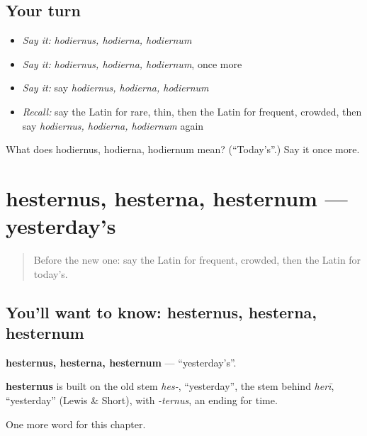 \subsection*{Your turn}
\begin{itemize}
\raggedright
  \item \emph{Say it:} \emph{hodiernus, hodierna, hodiernum}
  \item \emph{Say it:} \emph{hodiernus, hodierna, hodiernum}, once more
  \item \emph{Say it:} say \emph{hodiernus, hodierna, hodiernum}
  \item \emph{Recall:} say the Latin for rare, thin, then the Latin for frequent, crowded, then say \emph{hodiernus, hodierna, hodiernum} again
\end{itemize}

\begin{tcolorbox}[breakable,colback=teal!4,colframe=teal!35!black,title={Before you move on}]
What does hodiernus, hodierna, hodiernum mean? (\textquotedblleft{}Today's\textquotedblright{}.) Say it once more.
\end{tcolorbox}
\section[hesternus, hesterna, hesternum]{hesternus, hesterna, hesternum — yesterday's}

\label{lesson:LA-C215-hesternus}



\begin{quote}
Before the new one: say the Latin for frequent, crowded, then the Latin for today's.
\end{quote}

\subsection*{You'll want to know: hesternus, hesterna, hesternum}
\textbf{hesternus, hesterna, hesternum} — \textquotedblleft{}yesterday's\textquotedblright{}.

\begin{cousinweb}
\textbf{hesternus} is built on the old stem \emph{hes-}, \textquotedblleft{}yesterday\textquotedblright{}, the stem behind \emph{herī}, \textquotedblleft{}yesterday\textquotedblright{} (Lewis \& Short), with \emph{-ternus}, an ending for time.
\end{cousinweb}

\begin{grammarlens}[title={What you've built}]
One more word for this chapter.
\end{grammarlens}

